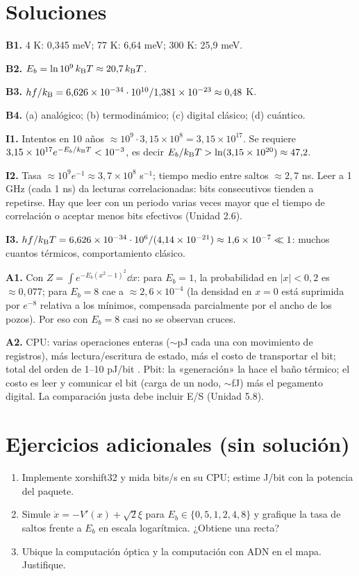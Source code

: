 \documentclass[11pt,a4paper]{article}
\begin{document}
\section{Soluciones}
\begin{solucion}
\textbf{B1.} 4 K: 0,345 meV; 77 K: 6,64 meV; 300 K: 25,9 meV.

\textbf{B2.} $E_b=\ln10^9\,k_{\mathrm B} T\approx20{,}7\,k_{\mathrm B} T$.

\textbf{B3.} $hf/k_{\mathrm B}=6{,}626\times10^{-34}\cdot10^{10}/1{,}381\times10^{-23}\approx0{,}48$ K.

\textbf{B4.} (a) analógico; (b) termodinámico; (c) digital clásico; (d) cuántico.

\textbf{I1.} Intentos en 10 años $\approx10^9\cdot3{,}15\times10^8=3{,}15\times10^{17}$. Se requiere $3{,}15\times10^{17}e^{-E_b/k_{\mathrm B} T}<10^{-3}$, es decir $E_b/k_{\mathrm B} T>\ln(3{,}15\times10^{20})\approx47{,}2$.

\textbf{I2.} Tasa $\approx10^9e^{-1}\approx3{,}7\times10^8$ s$^{-1}$; tiempo medio entre saltos $\approx2{,}7$ ns. Leer a 1 GHz (cada 1 ns) da lecturas correlacionadas: bits consecutivos tienden a repetirse. Hay que leer con un periodo varias veces mayor que el tiempo de correlación o aceptar menos bits efectivos (Unidad 2.6).

\textbf{I3.} $hf/k_{\mathrm B} T=6{,}626\times10^{-34}\cdot10^6/(4{,}14\times10^{-21})\approx1{,}6\times10^{-7}\ll1$: muchos cuantos térmicos, comportamiento clásico.

\textbf{A1.} Con $Z=\int e^{-E_b(x^2-1)^2}\dd x$: para $E_b=1$, la probabilidad en $|x|<0{,}2$ es $\approx0{,}077$; para $E_b=8$ cae a $\approx2{,}6\times10^{-4}$ (la densidad en $x=0$ está suprimida por $e^{-8}$ relativa a los mínimos, compensada parcialmente por el ancho de los pozos). Por eso con $E_b=8$ casi no se observan cruces.

\textbf{A2.} CPU: varias operaciones enteras ($\sim$pJ cada una con movimiento de registros), más lectura/escritura de estado, más el costo de transportar el bit; total del orden de 1--10 pJ/bit \evE. Pbit: la «generación» la hace el baño térmico; el costo es leer y comunicar el bit (carga de un nodo, $\sim$fJ) más el pegamento digital. La comparación justa debe incluir E/S (Unidad 5.8).
\end{solucion}

\section{Ejercicios adicionales (sin solución)}
\begin{enumerate}[label=\textbf{P\arabic*.}]
\item Implemente xorshift32 y mida bits/s en su CPU; estime J/bit con la potencia del paquete.
\item Simule $\dot x=-V'(x)+\sqrt2\xi$ para $E_b\in\{0{,}5,1,2,4,8\}$ y grafique la tasa de saltos frente a $E_b$ en escala logarítmica. ¿Obtiene una recta?
\item Ubique la computación óptica y la computación con ADN en el mapa. Justifique.
\end{enumerate}
\end{document}
